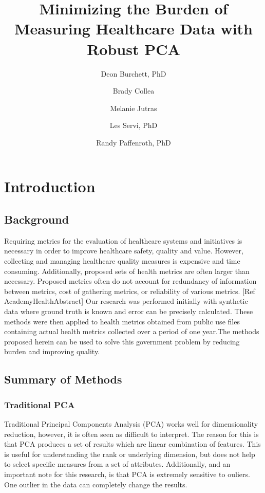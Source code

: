 \documentclass{article}
\author[1]{Deon Burchett, PhD}
\author[2]{Brady Collea}
\author[3]{Melanie Jutras}
\author[4]{Les Servi, PhD}
\author[5]{Randy Paffenroth, PhD}
\affil[1,2,3,4]{The MITRE Corporation}
\affil[5]{Worcester Polytechnic Institute}
\title{Minimizing the Burden of Measuring Healthcare Data with Robust PCA}
\date{}
\begin{document}
\maketitle

\section{Introduction}
\subsection{Background}
Requiring metrics for the evaluation of healthcare systems and initiatives is necessary in order to improve healthcare safety, quality and value. However, collecting and managing healthcare quality measures is expensive and time consuming. Additionally,  proposed sets of health metrics are often larger than necessary. Proposed metrics often do not account for redundancy of information between metrics, cost of gathering metrics, or reliability of various metrics. [Ref AcademyHealthAbstract]  Our research was performed initially with synthetic data where ground truth is known and error can be precisely calculated. These methods were then applied to health metrics obtained from public use files containing actual health metrics collected over a period of one year.The methods proposed herein can be used to solve this government problem by reducing burden and improving quality.
\subsection{Summary of Methods}
\subsubsection{Traditional PCA}
Traditional Principal Components Analysis (PCA) works well for dimensionality reduction, however, it is often seen as difficult to interpret.  The reason for this is that PCA produces a set of results which are linear combination of features.  This is useful for understanding the rank or underlying dimension, but does not help to select specific measures from a set of attributes. Additionally, and an important note for this research, is that PCA is extremely sensitive to ouliers.  One outlier in the data can completely change the results.
\end{document}
